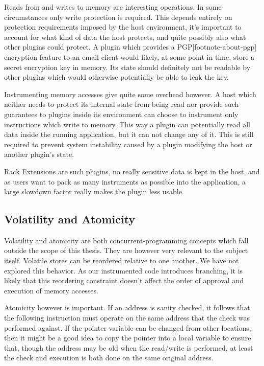 \noindent Reads from and writes to memory are interesting operations. In some
circumstances only write protection is required. This depends entirely on
protection requirements imposed by the host environment, it's important to
account for what kind of data the host protects, and quite possibly also what
other plugins could protect. A plugin which provides a PGP[footnote-about-pgp]
encryption feature to an email client would likely, at some point in time, store
a secret encryption key in memory. Its state should definitely not be readable
by other plugins which would otherwise potentially be able to leak the key.

Instrumenting memory accesses give quite some overhead however. A host which
neither needs to protect its internal state from being read nor provide such
guarantees to plugins inside its environment can choose to instrument only
instructions which write to memory. This way a plugin can potentially read all
data inside the running application, but it can not change any of it. This is
still required to prevent system instability caused by a plugin modifying the
host or another plugin's state.

Rack Extensions are such plugins, no really sensitive data is kept in the host,
and as users want to pack as many instruments as possible into the application,
a large slowdown factor really makes the plugin less usable.

\subsection {Volatility and Atomicity}

Volatility and atomicity are both concurrent-programming concepts which fall
outside the scope of this thesis. They are however very relevant to the subject
itself. Volatile stores can be reordered relative to one another. We have not
explored this behavior. As our instrumented code introduces branching, it is
likely that this reordering constraint doesn't affect the order of approval and
execution of memory accesses.

Atomicity however is important. If an address is sanity checked, it follows that
the following instruction must operate on the same address that the check was
performed against. If the pointer variable can be changed from other locations,
then it might be a good idea to copy the pointer into a local variable to ensure
that, though the address may be old when the read/write is performed, at least
the check and execution is both done on the same original address.

